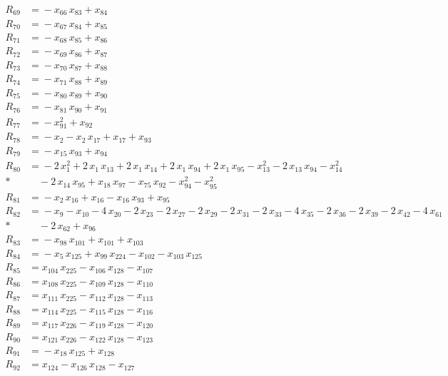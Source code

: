 \begin{align*}
R_{69} &={} -x_{66}\,x_{83} +x_{84} \\[3pt]
R_{70} &={} -x_{67}\,x_{84} +x_{85} \\[3pt]
R_{71} &={} -x_{68}\,x_{85} +x_{86} \\[3pt]
R_{72} &={} -x_{69}\,x_{86} +x_{87} \\[3pt]
R_{73} &={} -x_{70}\,x_{87} +x_{88} \\[3pt]
R_{74} &={} -x_{71}\,x_{88} +x_{89} \\[3pt]
R_{75} &={} -x_{80}\,x_{89} +x_{90} \\[3pt]
R_{76} &={} -x_{81}\,x_{90} +x_{91} \\[3pt]
R_{77} &={} -x_{91}^{2} +x_{92} \\[3pt]
R_{78} &={} -x_{2} -x_{2}\,x_{17} +x_{17} +x_{93} \\[3pt]
R_{79} &={} -x_{15}\,x_{93} +x_{94} \\[3pt]
R_{80} &={} -2\,x_{1}^{2} +2\,x_{1}\,x_{13} +2\,x_{1}\,x_{14} +2\,x_{1}\,x_{94} +2\,x_{1}\,x_{95} -x_{13}^{2} -2\,x_{13}\,x_{94} -x_{14}^{2} \\*
&\quad{} -2\,x_{14}\,x_{95} +x_{18}\,x_{97} -x_{75}\,x_{92} -x_{94}^{2} -x_{95}^{2} \\[3pt]
R_{81} &={} -x_{2}\,x_{16} +x_{16} -x_{16}\,x_{93} +x_{95} \\[3pt]
R_{82} &={} -x_{9} -x_{10} -4\,x_{20} -2\,x_{23} -2\,x_{27} -2\,x_{29} -2\,x_{31} -2\,x_{33} -4\,x_{35} -2\,x_{36} -2\,x_{39} -2\,x_{42} -4\,x_{61} \\*
&\quad{} -2\,x_{62} +x_{96} \\[3pt]
R_{83} &={} -x_{98}\,x_{101} +x_{101} +x_{103} \\[3pt]
R_{84} &={} -x_{5}\,x_{125} +x_{99}\,x_{224} -x_{102} -x_{103}\,x_{125} \\[3pt]
R_{85} &={} x_{104}\,x_{225} -x_{106}\,x_{128} -x_{107} \\[3pt]
R_{86} &={} x_{108}\,x_{225} -x_{109}\,x_{128} -x_{110} \\[3pt]
R_{87} &={} x_{111}\,x_{225} -x_{112}\,x_{128} -x_{113} \\[3pt]
R_{88} &={} x_{114}\,x_{225} -x_{115}\,x_{128} -x_{116} \\[3pt]
R_{89} &={} x_{117}\,x_{226} -x_{119}\,x_{128} -x_{120} \\[3pt]
R_{90} &={} x_{121}\,x_{226} -x_{122}\,x_{128} -x_{123} \\[3pt]
R_{91} &={} -x_{18}\,x_{125} +x_{128} \\[3pt]
R_{92} &={} x_{124} -x_{126}\,x_{128} -x_{127} \\[3pt]

\end{align*}
